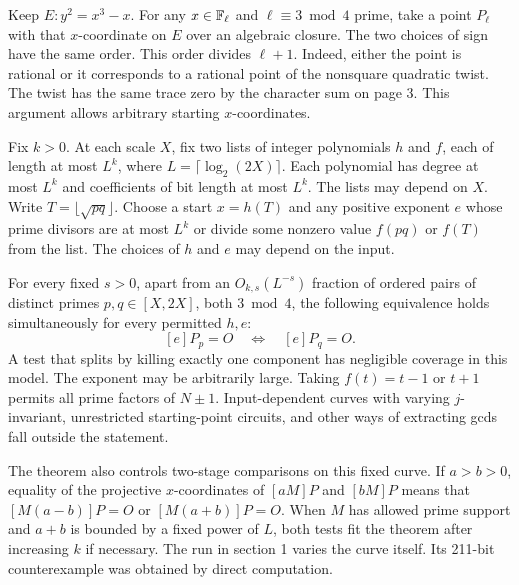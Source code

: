 Keep $E:y^2=x^3-x$. For any $x\in\mathbb F_\ell$ and $\ell\equiv3\bmod4$ prime, take a point $P_\ell$ with that $x$-coordinate on $E$ over an algebraic closure. The two choices of sign have the same order. This order divides $\ell+1$. Indeed, either the point is rational or it corresponds to a rational point of the nonsquare quadratic twist. The twist has the same trace zero by the character sum on page 3. This argument allows arbitrary starting $x$-coordinates.

Fix $k>0$. At each scale $X$, fix two lists of integer polynomials $h$ and $f$, each of length at most $L^k$, where $L=\lceil\log_2(2X)\rceil$. Each polynomial has degree at most $L^k$ and coefficients of bit length at most $L^k$. The lists may depend on $X$. Write $T=\lfloor\sqrt{pq}\rfloor$. Choose a start $x=h(T)$ and any positive exponent $e$ whose prime divisors are at most $L^k$ or divide some nonzero value $f(pq)$ or $f(T)$ from the list. The choices of $h$ and $e$ may depend on the input.

For every fixed $s>0$, apart from an $O_{k,s}(L^{-s})$ fraction of ordered pairs of distinct primes $p,q\in[X,2X]$, both $3\bmod4$, the following equivalence holds simultaneously for every permitted $h,e$:
\[
        [e]P_p=O \quad\Longleftrightarrow\quad [e]P_q=O .
\]
A test that splits by killing exactly one component has negligible coverage in this model. The exponent may be arbitrarily large. Taking $f(t)=t-1$ or $t+1$ permits all prime factors of $N\pm1$. Input-dependent curves with varying $j$-invariant, unrestricted starting-point circuits, and other ways of extracting gcds fall outside the statement.

The theorem also controls two-stage comparisons on this fixed curve. If $a>b>0$, equality of the projective $x$-coordinates of $[aM]P$ and $[bM]P$ means that $[M(a-b)]P=O$ or $[M(a+b)]P=O$. When $M$ has allowed prime support and $a+b$ is bounded by a fixed power of $L$, both tests fit the theorem after increasing $k$ if necessary. The run in section 1 varies the curve itself. Its 211-bit counterexample was obtained by direct computation.

